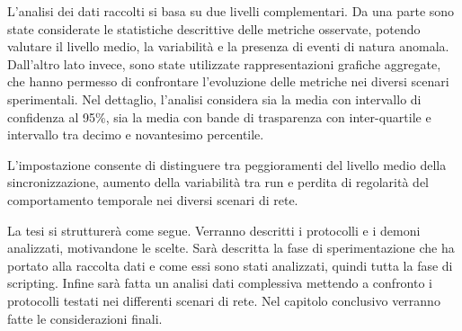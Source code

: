 L'analisi dei dati raccolti si basa su due livelli complementari. Da una parte sono
state considerate le statistiche descrittive delle metriche osservate, potendo
valutare il livello medio, la variabilità e la presenza di eventi di natura anomala.
Dall'altro lato invece, sono state utilizzate rappresentazioni grafiche aggregate,
che hanno permesso di confrontare l'evoluzione delle metriche nei diversi
scenari sperimentali. Nel dettaglio, l'analisi considera sia la media con
intervallo di confidenza al 95\%, sia la media con bande di trasparenza con
inter-quartile e intervallo tra decimo e novantesimo percentile.

L'impostazione consente di distinguere tra peggioramenti del livello medio della
sincronizzazione, aumento della variabilità tra run e perdita di regolarità del comportamento
temporale nei diversi scenari di rete.

La tesi si strutturerà come segue. Verranno descritti i protocolli e i demoni analizzati,
motivandone le scelte. Sarà descritta la fase di sperimentazione che ha portato alla
raccolta dati e come essi sono stati analizzati, quindi tutta la fase di
scripting. Infine sarà fatta un analisi dati complessiva mettendo a confronto i protocolli
testati nei differenti scenari di rete. Nel capitolo conclusivo verranno fatte
le considerazioni finali.